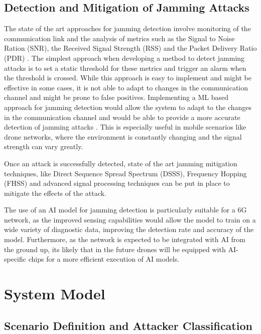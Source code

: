 \documentclass[futureinternet,article,submit,pdftex,moreauthors]{Definitions/mdpi}
\begin{document}
\subsection{Detection and Mitigation of Jamming Attacks}\label{sec:DetectionMitigation}

The state of the art approaches for jamming detection involve monitoring of the communication link and the analysis of metrics such as the Signal to Noise Ration (SNR), the Received Signal Strength (RSS) and the Packet Delivery Ratio (PDR) \cite{JammingDetection-Sciancalepore}. The simplest approach when 
developing a method to detect jamming attacks is to set a static threshold for these metrics and trigger an alarm when the threshold is crossed. While this approach is easy to implement and might be effective in some cases, it is not able to adapt to changes in the communication channel and might be prone to false positives.
Implementing a ML based approach for jamming detection would allow the system to adapt to the changes in the communication channel and would be able to provide a more accurate detection of jamming attacks \cite{VANETsAI-Lyamin}. This is especially useful in mobile scenarios like 
drone networks, where the environment is constantly changing and the signal strength can vary greatly. 

Once an attack is successfully detected, state of the art jamming mitigation techniques, like Direct Sequence Spread Spectrum (DSSS), Frequency Hopping (FHSS) and advanced signal processing techniques can be put in place to mitigate the 
effects of the attack. 

The use of an AI model for jamming detection is particularly suitable for a 6G network, as the improved sensing capabilities would allow the model to train on a wide variety of diagnostic data, improving the detection rate and accuracy of the model. 
Furthermore, as the network is expected to be integrated with AI from the ground up, its likely that in the future drones will be equipped with AI-specific chips for a more efficient execution of AI models.

\section{System Model}

\subsection{Scenario Definition and Attacker Classification}
\end{document}
